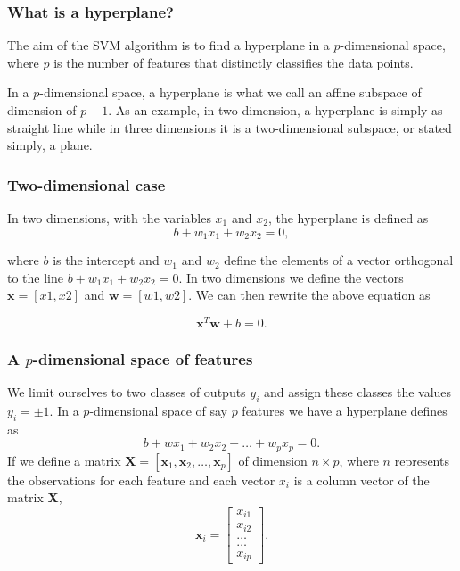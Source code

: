 \documentclass{beamer}
\begin{document}
\begin{frame}
\frametitle{What is a hyperplane?}

The aim of the SVM algorithm is to find a hyperplane in a
$p$-dimensional space, where $p$ is the number of features that
distinctly classifies the data points.

In a $p$-dimensional space, a hyperplane is what we call an affine
subspace of dimension of $p-1$.  As an example, in two dimension, a
hyperplane is simply as straight line while in three dimensions it is
a two-dimensional subspace, or stated simply, a plane.
\end{frame}

\begin{frame}
\frametitle{Two-dimensional case}

In two dimensions, with the variables $x_1$ and $x_2$, the hyperplane is defined as
\[
b+w_1x_1+w_2x_2=0,
\]

where $b$ is the intercept and $w_1$ and $w_2$ define the elements of a vector orthogonal to the line 
$b+w_1x_1+w_2x_2=0$. 
In two dimensions we define the vectors $\bm{x} =[x1,x2]$ and $\bm{w}=[w1,w2]$. 
We can then rewrite the above equation as 

\[
\bm{x}^T\bm{w}+b=0.
\]
\end{frame}

\begin{frame}
\frametitle{A $p$-dimensional space of features}

We limit ourselves to two classes of outputs $y_i$ and assign these classes the values $y_i = \pm 1$. 
In a $p$-dimensional space of say $p$ features we have a hyperplane defines as 
\[
b+wx_1+w_2x_2+\dots +w_px_p=0.
\]
If we define a 
matrix $\bm{X}=\left[\bm{x}_1,\bm{x}_2,\dots, \bm{x}_p\right]$
of dimension $n\times p$, where $n$ represents the observations for each feature and each vector $x_i$ is a column vector of the matrix $\bm{X}$, 
\[
\bm{x}_i = \begin{bmatrix} x_{i1} \\ x_{i2} \\ \dots \\ \dots \\ x_{ip} \end{bmatrix}.
\]
\end{frame}
\end{document}
